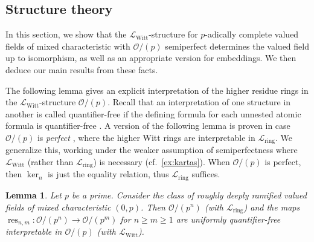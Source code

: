 \documentclass[a4paper]{amsart}
\theoremstyle{mystyle2}
\newtheorem{lem}[thm]{Lemma}
\theoremstyle{mystyle}
\DeclareMathOperator{\res}{res}
\renewcommand{\L}{\mathcal{L}}
\newcommand{\Lring}{\L_{\mathrm{ring}}}
\newcommand{\LWitt}{\L_{\mathrm{Witt}}}
\renewcommand{\O}{\mathcal{O}}
\numberwithin{equation}{section}
\begin{document}
    \subsection{Structure theory}\label{ssec:structure.theory}
    In this section, we show that the $\LWitt$-structure for $p$-adically complete valued fields of mixed characteristic with $\O/(p)$ semiperfect determines the 
    valued field up to isomorphism, as well as an appropriate version for embeddings.
    We then deduce our main results from these facts.
    
    The following lemma gives an explicit interpretation of the higher residue
    rings in the $\LWitt$-structure $\O/(p)$. Recall that an interpretation of one
    structure in another is called quantifier-free if the defining formula for each unnested atomic formula is quantifier-free \cite[Sec.~5.4(a)]{Hod}.
    A version of the following lemma is proven in case $\O/(p)$ is \emph{perfect} 
    \cite[Lemma 3.4.5]{Kar24}, where the higher Witt rings are interpretable in $\Lring$. We generalize this, working under the weaker
    assumption of semiperfectness where $\LWitt$ (rather than $\Lring$) is necessary (cf.~\cref{ex:kartas}). When $\O/(p)$ is
    perfect, then $\ker_n$ is just the equality relation, thus $\Lring$ suffices.
    \begin{lem}\label{lem:interpretability}
        Let \(p\) be a prime. Consider the class of roughly deeply ramified valued fields of mixed characteristic \( (0,p) \).
        Then \(\O/(p^n)\) (with \(\Lring\)) and the maps $\res_{n,m}\colon \O/(p^n)\to \O/(p^m)$ for $n \geq m \geq 1$ are uniformly quantifier-free interpretable in 
        \(\O/(p)\) (with \(\LWitt\)).
    \end{lem}
\end{document}
